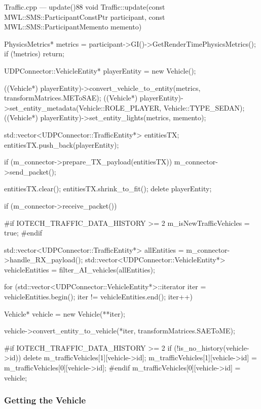 \begin{codelist}{Traffic.cpp --- update()}{88}
void Traffic::update(const MWL::SMS::ParticipantConstPtr participant, const MWL::SMS::ParticipantMemento memento) {
    PhysicsMetrics* metrics = participant->GI()->GetRenderTimePhysicsMetrics();
    if (!metrics) {
        return;
    }

    UDPConnector::VehicleEntity* playerEntity = new Vehicle();

    ((Vehicle*) playerEntity)->convert_vehicle_to_entity(metrics, transformMatrices.METoSAE);
    ((Vehicle*) playerEntity)->set_entity_metadata(Vehicle::ROLE_PLAYER, Vehicle::TYPE_SEDAN);
    ((Vehicle*) playerEntity)->set_entity_lights(metrics, memento);

    std::vector<UDPConnector::TrafficEntity*> entitiesTX;
    entitiesTX.push_back(playerEntity);

    if (m_connector->prepare_TX_payload(entitiesTX)) {
        m_connector->send_packet();
    }

    entitiesTX.clear();
    entitiesTX.shrink_to_fit();
    delete playerEntity;

    if (m_connector->receive_packet()) {
#if IOTECH_TRAFFIC_DATA_HISTORY >= 2
        m_isNewTrafficVehicles = true;
#endif

        std::vector<UDPConnector::TrafficEntity*> allEntities     = m_connector->handle_RX_payload();
        std::vector<UDPConnector::VehicleEntity*> vehicleEntities = filter_AI_vehicles(allEntities);

        for (std::vector<UDPConnector::VehicleEntity*>::iterator iter = vehicleEntities.begin(); iter != vehicleEntities.end(); iter++) {
            Vehicle* vehicle = new Vehicle(**iter);

            vehicle->convert_entity_to_vehicle(*iter, transformMatrices.SAEToME);

#if IOTECH_TRAFFIC_DATA_HISTORY >= 2
            if (!is_no_history(vehicle->id)) {
                delete m_trafficVehicles[1][vehicle->id];
            }
            m_trafficVehicles[1][vehicle->id] = m_trafficVehicles[0][vehicle->id];
#endif
            m_trafficVehicles[0][vehicle->id] = vehicle;
        }
    }
}
\end{codelist}

\subsubsection{Getting the Vehicle}

